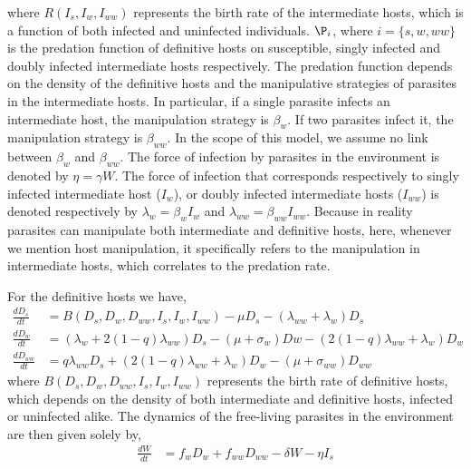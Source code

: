 \documentclass[11pt]{article}
\begin{document}
where $R(I_s, I_w, I_{ww})$ represents the birth rate of the intermediate hosts, which is a function of both infected and uninfected individuals.
$\P_i$, where $i = \{s, w, ww\}$ is the predation function of definitive hosts on susceptible, singly infected and doubly infected intermediate hosts respectively. 
The predation function depends on the density of the definitive hosts and the manipulative strategies of parasites in the intermediate hosts. 
In particular, if a single parasite infects an intermediate host, the manipulation strategy is $\beta_w$. 
If two parasites infect it, the manipulation strategy is $\beta_{ww}$. 
In the scope of this model, we assume no link between $\beta_w$ and $\beta_{ww}$. 
The force of infection by parasites in the environment is denoted by $\eta = \gamma W$. 
The force of infection that corresponds respectively to singly infected intermediate host ($I_w$), or doubly infected intermediate hosts ($I_{ww}$) is denoted respectively by $\lambda_w = \beta_w I_w$ and $\lambda_{ww} = \beta_{ww} I_{ww}$. Because in reality parasites can manipulate both intermediate and definitive hosts, here, whenever we mention host manipulation, it specifically refers to the manipulation in intermediate hosts, which correlates to the predation rate.

For the definitive hosts we have,
\begin{align}
\frac{dD_s}{dt} &= B(D_s,  D_w,  D_{ww},  I_s, I_w, I_{ww})  - \mu D_s - (\lambda_{ww} + \lambda_w) D_s \nonumber \\    
\frac{dD_w}{dt} &= (\lambda_w + 2 (1 - q) \lambda_{ww}) D_s - (\mu + \sigma_w) Dw - (2 (1 - q) \lambda_{ww} + \lambda_w) D_w  \label{odes:dhosts} \\         
\frac{dD_{ww}}{dt} &= q \lambda_{ww} D_s + (2 (1 - q) \lambda_{ww} + \lambda_w) D_w - (\mu + \sigma_{ww}) D_{ww} \nonumber
\end{align}
%
where $B(D_s, D_w, D_{ww}, I_s, I_w, I_{ww})$ represents the birth rate of definitive hosts, which depends on the density of both intermediate and definitive hosts, infected or uninfected alike. 
The dynamics of the free-living parasites in the environment are then given solely by,
\begin{align}
	\frac{dW}{dt} &= f_w D_w + f_{ww} D_{ww} - \delta W - \eta I_s \label{odes:eparasite}
\end{align}
\end{document}
